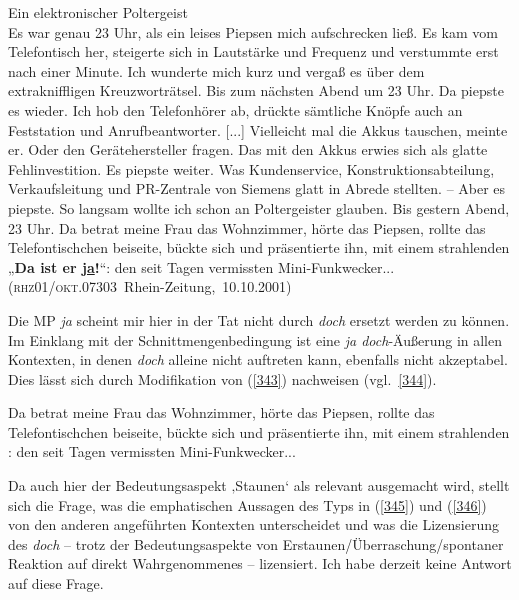 \begin{exe}
	\ex\label{343} 

	Ein elektronischer Poltergeist\\
	Es war genau 23 Uhr, als ein leises Piepsen mich aufschrecken ließ. Es kam vom Telefontisch her, steigerte sich in Lautstärke und Frequenz und 				verstummte erst nach einer Minute. Ich wunderte mich kurz und vergaß es über dem extrakniffligen Kreuzworträtsel. Bis zum nächsten Abend um 23 Uhr. Da 	piepste es wieder. Ich hob den Telefonhörer ab, drückte sämtliche Knöpfe auch an Feststation und Anrufbeantworter. [...]
	Vielleicht mal die Akkus tauschen, meinte er. Oder den Gerätehersteller fragen. Das mit den Akkus erwies sich als glatte Fehlinvestition. Es piepste 		weiter. Was Kundenservice, Konstruktionsabteilung, Verkaufsleitung und PR-Zentrale von Siemens glatt in Abrede stellten. – Aber es piepste. So langsam 	wollte ich schon an Poltergeister glauben. Bis gestern Abend, 23 Uhr. Da betrat meine Frau das Wohnzimmer, hörte das Piepsen, rollte das 					Telefontischchen beiseite, bückte sich und präsentierte ihn, mit einem strahlenden „\textbf{Da ist er \underline{ja}!}“: den seit Tagen 			vermissten Mini-Funkwecker...\\ 
	\hbox{}\hfill\hbox{(\textsc{rhz01/okt.07303} Rhein-Zeitung, 10.10.2001)}	
\end{exe}					
Die MP \textit{ja} scheint mir hier in der Tat nicht durch \textit{doch} ersetzt werden zu können. Im Einklang mit der Schnittmengenbedingung ist eine \textit{ja doch}-Äußerung in allen Kontexten, in denen \textit{doch} alleine nicht auftreten kann, ebenfalls nicht akzeptabel. Dies lässt sich durch Modifikation von (\ref{343}) nachweisen (vgl.\ \ref{344}).

\begin{exe}
	\ex\label{344} 

	Da betrat meine Frau das Wohnzimmer, hörte das Piepsen, rollte das Telefontischchen beiseite, bückte sich und präsentierte ihn, mit einem strahlenden  	: den seit Tagen vermissten Mini-Funkwecker... 
\end{exe}	
Da auch hier der Bedeutungsaspekt ‚Staunen‘  als relevant ausgemacht wird, stellt sich die Frage, was die emphatischen Aussagen des Typs in (\ref{345}) und (\ref{346}) von den anderen angeführten Kontexten unterscheidet und was die Lizensierung des \textit{doch} – trotz der Bedeutungsaspekte von Erstaunen/Überraschung/spontaner Reaktion auf direkt Wahrgenommenes – lizensiert. Ich habe derzeit keine Antwort auf diese Frage.

